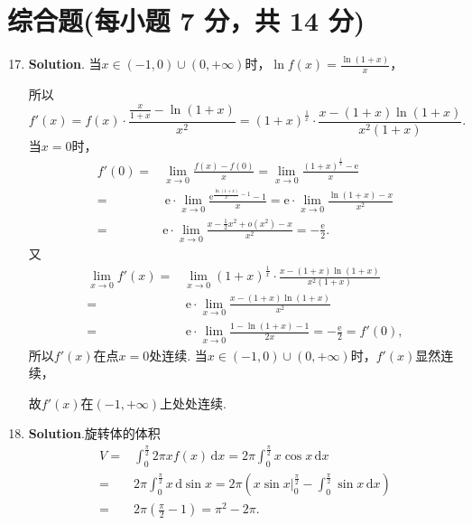 \documentclass[../main.tex]{subfiles}
\begin{document}
\section{综合题(每小题 7 分，共 14 分)}
\begin{enumerate}
    \setcounter{enumi}{16}
    \item \textbf{Solution}. 当$x\in(-1,0)\cup(0,+\infty)$时，$\ln f(x) = \frac{\ln(1+x)}{x}$，

          所以
          \[
              f'(x)=f(x)\cdot \frac{\frac{x}{1+x}-\ln(1+x)}{x^{2}}=(1+x)^{\frac{1}{x}}
              \cdot\frac{x-(1+x)\ln(1+x)}{x^{2}(1+x)}.
          \]
          当$x=0$时，
          \[
              \begin{aligned}
                  f'(0)= {} & \lim_{x\to0}\frac{f(x)-f(0)}{x}=  \lim_{x\to0}\frac{(1+x)^{\frac{1}{x}}-\mathrm{e}}{x}                                         \\
                  = {}      & \,\mathrm{e}\cdot\lim_{x\to0}\frac{\mathrm{e}^{\frac{\ln(1+x)}{x}-1}-1}{x}= \mathrm{e}\cdot \lim_{x\to0}\frac{\ln(1+x)-x}{x^2} \\
                  = {}      & \mathrm{e}\cdot \lim_{x\to0}\frac{x-\frac{1}{2}x^2+o(x^2)-x}{x^2}=-\frac{\mathrm{e}}{2}.
              \end{aligned}
          \]
          又
          \[
              \begin{aligned}
                  \lim_{x\to0}f'(x) = {} & \lim_{x\to0}(1+x)^{\frac{1}{x}}\cdot\frac{x-(1+x)\ln(1+x)}{x^{2}(1+x)}            \\
                  = {}                   & \,\mathrm{e}\cdot\lim_{x\to0}\frac{x-(1+x)\ln(1+x)}{x^{2}}                        \\
                  = {}                   & \,\mathrm{e}\cdot\lim_{x\to0}\frac{1-\ln(1+x)-1}{2x}=-\frac{\mathrm{e}}{2}=f'(0),
              \end{aligned}
          \]
          所以$f'(x)$在点$x=0$处连续. 当$x\in(-1,0)\cup(0,+\infty)$时，$f'(x)$显然连续，

          故$f'(x)$在$(-1,+\infty)$上处处连续.

    \item \textbf{Solution}.旋转体的体积
          \[
              \begin{aligned}
                  V= {} & \int_{0}^{\frac{\pi}{2}}2\pi x f(x)\,\mathrm{d}x = 2\pi\int_{0}^{\frac{\pi}{2}}x\cos x\,\mathrm{d}x                                              \\
                  = {}  & 2\pi\int_{0}^{\frac{\pi}{2}}x\,\mathrm{d}\sin x = 2\pi\left(x\sin x\bigg|_{0}^{\frac{\pi}{2}}-\int_{0}^{\frac{\pi}{2}}\sin x\,\mathrm{d}x\right) \\
                  = {}  & 2\pi\left(\frac{\pi}{2}-1\right)=\pi^{2}-2\pi.
              \end{aligned}
          \]
\end{enumerate}
\end{document}
